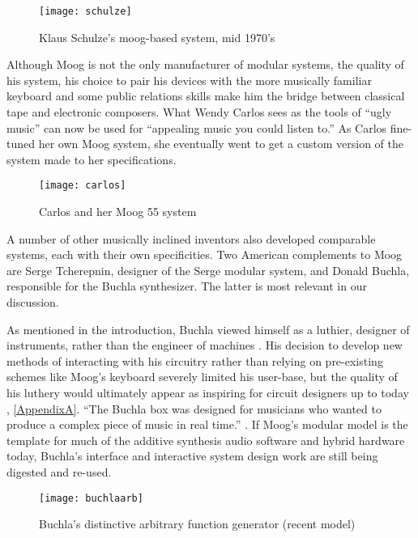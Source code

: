 \begin{itemize}
	\begin{figure}[h!]
	  \caption{Klaus Schulze's moog-based system, mid 1970's}
	  \centering
	    \texttt{[image: schulze]}
	\end{figure}

Although Moog is not the only manufacturer of modular systems, the quality of his system, his choice to pair his devices with the more musically familiar keyboard and some public relations skills make him the bridge between classical tape and electronic composers. What Wendy Carlos sees as the tools of ``ugly music'' can now be used for ``appealing music you could listen to.'' \cite[p.169]{holmes2002} As Carlos fine-tuned her own Moog system, she eventually went to get a custom version of the system made to her specifications. 

	\begin{figure}[h!]
	  \caption{Carlos and her Moog 55 system}
	  \centering
	    \texttt{[image: carlos]}
	\end{figure}

A number of other musically inclined inventors also developed comparable systems, each with their own specificities. Two American complements to Moog are Serge Tcherepnin, designer of the Serge modular system, and Donald Buchla, responsible for the Buchla synthesizer. The latter is most relevant in our discussion. 

As mentioned in the introduction, Buchla viewed himself as a luthier, designer of instruments, rather than the engineer of machines \citep{pinch2001}. His decision to develop new methods of interacting with his circuitry rather than relying on pre-existing schemes like Moog's keyboard severely limited his user-base, but the quality of his luthery would ultimately appear as inspiring for circuit designers up to today \citep{rylan2015}, \ref{AppendixA}. ``The Buchla box was designed for musicians who wanted to produce a complex piece of music in real time.'' \cite[p47]{pinch2002}. If Moog's modular model is the template for much of the additive synthesis audio software and hybrid hardware today, Buchla's interface and interactive system design work are still being digested and re-used. 

	\begin{figure}[h!]
	  \caption{Buchla's distinctive arbitrary function generator (recent model)}
	  \centering
	    \texttt{[image: buchlaarb]}
	\end{figure}


\end{itemize}
